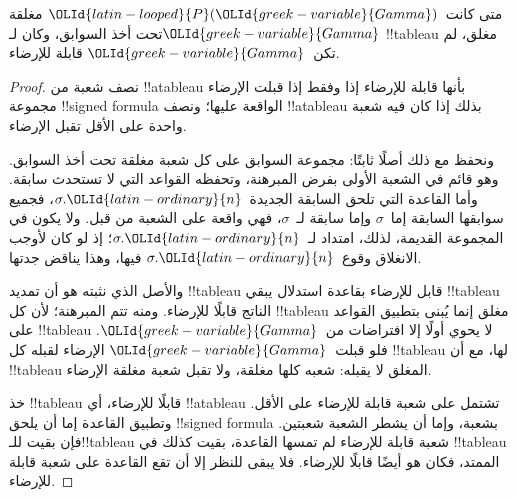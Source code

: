 \documentclass[../../../include/open-logic-section]{subfiles}
\begin{document}
\begin{thm}[السلامة]
  متى كانت~$\OLId{latin-looped}{P}(\OLId{greek-variable}{Gamma})$ مغلقة تحت أخذ السوابق، وكان لـ$\OLId{greek-variable}{Gamma}$
  !!{tableau} مغلق، لم تكن~$\OLId{greek-variable}{Gamma}$ قابلة للإرضاء.
\end{thm}

\begin{proof}
نصف شعبة من !!a{tableau} بأنها قابلة للإرضاء إذا وفقط إذا قبلت الإرضاء
مجموعة !!{signed formula} الواقعة عليها؛ ونصف !!a{tableau} بذلك إذا
كان فيه شعبة واحدة على الأقل تقبل الإرضاء.

ونحفظ مع ذلك أصلًا ثابتًا: مجموعة السوابق على كل شعبة مغلقة تحت أخذ
السوابق. وهو قائم في الشعبة الأولى بفرض المبرهنة، وتحفظه القواعد التي لا
تستحدث سابقة. وأما القاعدة التي تلحق السابقة الجديدة~$\sigma.\OLId{latin-ordinary}{n}$، فجميع
سوابقها السابقة إما~$\sigma$ وإما سابقة لـ~$\sigma$، فهي واقعة على
الشعبة من قبل. ولا يكون في المجموعة القديمة، لذلك، امتداد لـ~$\sigma.\OLId{latin-ordinary}{n}$؛
إذ لو كان لأوجب الانغلاق وقوع~$\sigma.\OLId{latin-ordinary}{n}$ فيها، وهذا يناقض جدتها.

والأصل الذي نثبته هو أن تمديد !!{tableau} قابل للإرضاء بقاعدة استدلال
يبقي !!{tableau} الناتج قابلًا للإرضاء. ومنه تتم المبرهنة؛ لأن كل
!!{tableau} مغلق إنما يُبنى بتطبيق القواعد على !!{tableau} لا يحوي
أولًا إلا افتراضات من~$\OLId{greek-variable}{Gamma}$. فلو قبلت~$\OLId{greek-variable}{Gamma}$ الإرضاء لقبله كل
!!{tableau} لها، مع أن !!{tableau} المغلق لا يقبله: شعبه كلها مغلقة،
ولا تقبل شعبة مغلقة الإرضاء.

خذ !!{tableau} قابلًا للإرضاء، أي !!a{tableau} تشتمل على شعبة قابلة
للإرضاء على الأقل. وتطبيق القاعدة إما أن يلحق !!{signed formula}
بشعبة، وإما أن يشطر الشعبة شعبتين. فإن بقيت للـ!!{tableau} شعبة قابلة للإرضاء لم تمسها
القاعدة، بقيت كذلك في !!{tableau} الممتد، فكان هو أيضًا قابلًا للإرضاء.
فلا يبقى للنظر إلا أن تقع القاعدة على شعبة قابلة للإرضاء.


\end{proof}
\end{document}
